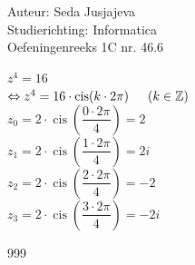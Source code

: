 \documentclass[a4paper]{article}
\begin{document}
\noindent \large Auteur: Seda Jusjajeva\\
\noindent \large Studierichting: Informatica\\
\noindent \large Oefeningenreeks 1C nr. 46.6\\

\medskip

\normalsize

$z^4 = 16$ \\

$\Leftrightarrow z^4 = 16\cdot\operatorname{cis}(k\cdot2\pi)\indent(k \in \mathbb{Z})$ \\

$z_0 = 2 \cdot\operatorname{cis}\left(\dfrac{0\cdot2\pi}{4}\right) = 2$ \\

$z_1 = 2 \cdot\operatorname{cis}\left(\dfrac{1\cdot 2\pi}{4}\right) = 2i$ \\

$z_2 = 2 \cdot\operatorname{cis}\left(\dfrac{2\cdot 2\pi}{4}\right) = -2$ \\

$z_3 = 2 \cdot\operatorname{cis}\left(\dfrac{3\cdot 2\pi}{4}\right) = -2i$ \\



\begin{thebibliography}{999}
\end{thebibliography}
\end{document}
